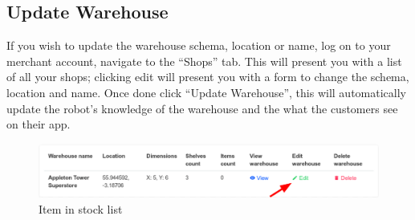 \documentclass[onecolumn]{IEEEtran}
\begin{document}
\subsection{Update Warehouse}
If you wish to update the warehouse schema, location or name, log on to your merchant account, navigate to the “Shops” tab. This will present you with a list  of all your shops; clicking edit will present you with a form to change the schema, location and name. Once done click “Update Warehouse”, this will automatically update the robot’s knowledge of the warehouse and the what the customers see on their app. 
\begin{figure}[H]
    \begin{center}
    \includegraphics[width=1\textwidth]{update_warehouse.png}
    \caption{Item in stock list}
    \label{fig: figure}
    \end{center}
\end{figure}
\end{document}
